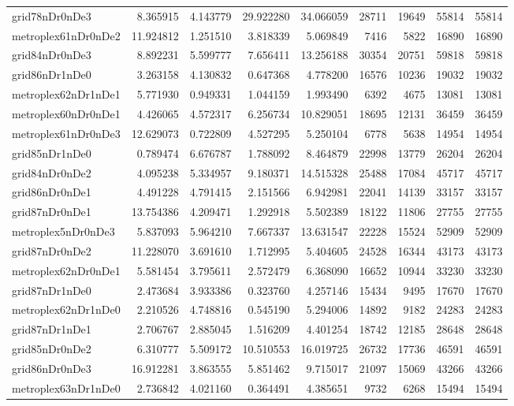 \begin{longtable}{|l|r|r|r|r|r|r|r|r|}
grid78nDr0nDe3 & 8.365915 & 4.143779 & 29.922280 & 34.066059 & 28711 & 19649 & 55814 & 55814 \\
metroplex61nDr0nDe2 & 11.924812 & 1.251510 & 3.818339 & 5.069849 & 7416 & 5822 & 16890 & 16890 \\
grid84nDr0nDe3 & 8.892231 & 5.599777 & 7.656411 & 13.256188 & 30354 & 20751 & 59818 & 59818 \\
grid86nDr1nDe0 & 3.263158 & 4.130832 & 0.647368 & 4.778200 & 16576 & 10236 & 19032 & 19032 \\
metroplex62nDr1nDe1 & 5.771930 & 0.949331 & 1.044159 & 1.993490 & 6392 & 4675 & 13081 & 13081 \\
metroplex60nDr0nDe1 & 4.426065 & 4.572317 & 6.256734 & 10.829051 & 18695 & 12131 & 36459 & 36459 \\
metroplex61nDr0nDe3 & 12.629073 & 0.722809 & 4.527295 & 5.250104 & 6778 & 5638 & 14954 & 14954 \\
grid85nDr1nDe0 & 0.789474 & 6.676787 & 1.788092 & 8.464879 & 22998 & 13779 & 26204 & 26204 \\
grid84nDr0nDe2 & 4.095238 & 5.334957 & 9.180371 & 14.515328 & 25488 & 17084 & 45717 & 45717 \\
grid86nDr0nDe1 & 4.491228 & 4.791415 & 2.151566 & 6.942981 & 22041 & 14139 & 33157 & 33157 \\
grid87nDr0nDe1 & 13.754386 & 4.209471 & 1.292918 & 5.502389 & 18122 & 11806 & 27755 & 27755 \\
metroplex5nDr0nDe3 & 5.837093 & 5.964210 & 7.667337 & 13.631547 & 22228 & 15524 & 52909 & 52909 \\
grid87nDr0nDe2 & 11.228070 & 3.691610 & 1.712995 & 5.404605 & 24528 & 16344 & 43173 & 43173 \\
metroplex62nDr0nDe1 & 5.581454 & 3.795611 & 2.572479 & 6.368090 & 16652 & 10944 & 33230 & 33230 \\
grid87nDr1nDe0 & 2.473684 & 3.933386 & 0.323760 & 4.257146 & 15434 & 9495 & 17670 & 17670 \\
metroplex62nDr1nDe0 & 2.210526 & 4.748816 & 0.545190 & 5.294006 & 14892 & 9182 & 24283 & 24283 \\
grid87nDr1nDe1 & 2.706767 & 2.885045 & 1.516209 & 4.401254 & 18742 & 12185 & 28648 & 28648 \\
grid85nDr0nDe2 & 6.310777 & 5.509172 & 10.510553 & 16.019725 & 26732 & 17736 & 46591 & 46591 \\
grid86nDr0nDe3 & 16.912281 & 3.863555 & 5.851462 & 9.715017 & 21097 & 15069 & 43266 & 43266 \\
metroplex63nDr1nDe0 & 2.736842 & 4.021160 & 0.364491 & 4.385651 & 9732 & 6268 & 15494 & 15494 \\

\end{longtable}
